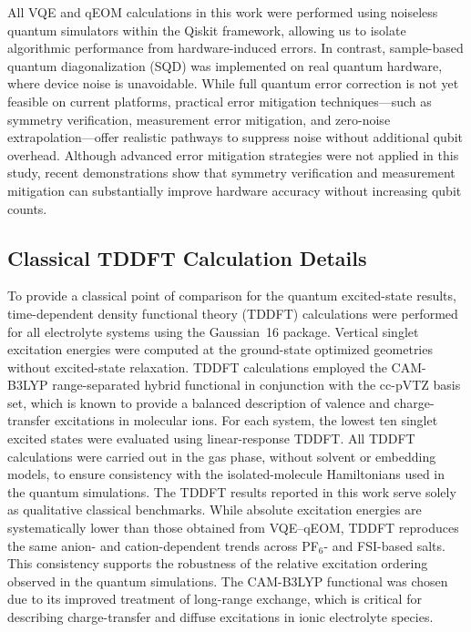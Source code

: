 \documentclass[num-refs]{wiley-article}
\begin{document}
All VQE and qEOM calculations in this work were performed using noiseless quantum simulators within the Qiskit framework, allowing us to isolate algorithmic performance from hardware-induced errors. In contrast, sample-based quantum diagonalization (SQD) was implemented on real quantum hardware, where device noise is unavoidable. While full quantum error correction is not yet feasible on current platforms, practical error mitigation techniques—such as symmetry verification, measurement error mitigation, and zero-noise extrapolation—offer realistic pathways to suppress noise without additional qubit overhead. Although advanced error mitigation strategies were not applied in this study, recent demonstrations show that symmetry verification and measurement mitigation can substantially improve hardware accuracy without increasing qubit counts.


\subsection{Classical TDDFT Calculation Details}

To provide a classical point of comparison for the quantum excited-state results, 
time-dependent density functional theory (TDDFT) calculations were performed for all electrolyte systems using the Gaussian~16 package.\cite{g16}
Vertical singlet excitation energies were computed at the ground-state optimized geometries without excited-state relaxation. TDDFT calculations employed the CAM-B3LYP\cite{yanai2004new,peach2008excitation} range-separated hybrid functional in conjunction with the cc-pVTZ basis set, which is known to provide a balanced description of valence and charge-transfer excitations in molecular ions. For each system, the lowest ten singlet excited states were evaluated using linear-response TDDFT.
All TDDFT calculations were carried out in the gas phase, without solvent or embedding models, to ensure consistency with the isolated-molecule Hamiltonians used in the quantum simulations. The TDDFT results reported in this work serve solely as qualitative classical benchmarks. While absolute excitation energies are systematically lower than those obtained from VQE--qEOM, TDDFT reproduces the same anion- and cation-dependent trends across PF$_6$- and FSI-based salts. This consistency supports the robustness of the relative excitation ordering observed in the quantum simulations. The CAM-B3LYP functional was chosen due to its improved treatment of long-range exchange, which is critical for describing charge-transfer and diffuse excitations in ionic electrolyte species.
\end{document}
